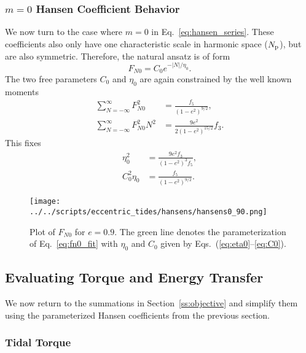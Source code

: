 \documentclass[
        fleqn,
        usenatbib,
    ]{mnras}
\newcommand*{\abs}[1]{\left|#1\right|}
\newcommand*{\p}[1]{\left(#1\right)}
\begin{document}
\subsubsection{$m = 0$ Hansen Coefficient Behavior}

We now turn to the case where $m = 0$ in Eq.~\eqref{eq:hansen_series}. These
coefficients also only have one characteristic scale in harmonic space ($N_{\rm
p}$), but are also symmetric. Therefore, the natural ansatz is of form
\begin{equation}
    F_{N0} = C_0 e^{-\abs{N} / \eta_0}.\label{eq:fn0_fit}
\end{equation}
The two free parameters $C_0$ and $\eta_0$ are again constrained by the well known
moments \citep{hut81}
\begin{align}
    \sum\limits_{N = -\infty}^\infty F_{N0}^2 &= \frac{f_5}{\p{1 - e^2}^{9/2}}
        ,\label{eq:moment_FN0}\\
    \sum\limits_{N = -\infty}^\infty F_{N0}^2 N^2
        &= \frac{9e^2}{2\p{1 - e^2}^{15/2}}
            f_3.\label{eq:moment_FN0_2}
\end{align}
This fixes
\begin{align}
    \eta_0^2 &= \frac{9e^2f_3}{\p{1 - e^2}^{3}f_5},\label{eq:eta0}\\
    C_0^2\eta_0 &= \frac{f_5}{\p{1 - e^2}^{9/2}}.\label{eq:C0}
\end{align}

\begin{figure}
    \centering
    \texttt{[image: ../../scripts/eccentric\_tides/hansens/hansens0\_90.png]}
    \caption{Plot of $F_{N0}$ for $e = 0.9$. The green line denotes the
    parameterization of Eq.~\eqref{eq:fn0_fit} with $\eta_0$ and $C_0$ given by
    Eqs.~(\ref{eq:eta0}--\ref{eq:C0}).}\label{fig:fn0_fit}
\end{figure}

\subsection{Evaluating Torque and Energy Transfer}\label{s:eval}

We now return to the summations in Section~\ref{ss:objective} and simplify them
using the parameterized Hansen coefficients from the previous section.

\subsubsection{Tidal Torque}
\end{document}
